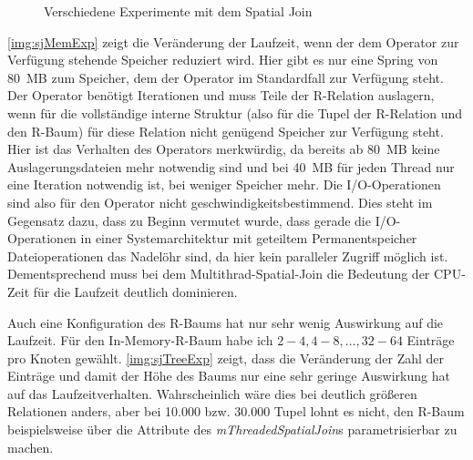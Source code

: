 \documentclass[a4paper,12pt,twoside]{article}
\newcommand{\Fb}[1]{\textit{#1}} %
\begin{document}
{\begin{figure}
	\centering
	\caption{Verschiedene Experimente mit dem Spatial Join}
	\label{img:sjExpAllg}
\end{figure}

\autoref{img:sjMemExp} zeigt die Veränderung der Laufzeit, wenn der dem Operator zur Verfügung stehende Speicher reduziert wird. Hier gibt es nur eine Spring von 80~MB zum Speicher, dem der Operator im Standardfall zur Verfügung steht. Der Operator benötigt Iterationen und muss Teile der R-Relation auslagern, wenn für die vollständige interne Struktur (also für die Tupel der R-Relation und den R-Baum) für diese Relation nicht genügend Speicher zur Verfügung steht. Hier ist das Verhalten des Operators merkwürdig, da bereits ab 80~MB keine Auslagerungsdateien mehr notwendig sind und bei 40~MB für jeden Thread nur eine Iteration notwendig ist, bei weniger Speicher mehr. Die I/O-Operationen sind also für den Operator nicht geschwindigkeitsbestimmend. Dies steht im Gegensatz dazu, dass zu Beginn vermutet wurde, dass gerade die I/O-Operationen in einer Systemarchitektur mit geteiltem Permanentspeicher Dateioperationen das Nadelöhr sind, da hier kein paralleler Zugriff möglich ist. Dementsprechend muss bei dem Multithrad-Spatial-Join die Bedeutung der CPU-Zeit für die Laufzeit deutlich dominieren.

Auch eine Konfiguration des R-Baums hat nur sehr wenig Auswirkung auf die Laufzeit. Für den In-Memory-R-Baum habe ich $2-4, 4-8, \ldots, 32-64$ Einträge pro Knoten gewählt. \autoref{img:sjTreeExp} zeigt, dass die Veränderung der Zahl der Einträge und damit der Höhe des Baums nur eine sehr geringe Auswirkung hat auf das Laufzeitverhalten. Wahrscheinlich wäre dies bei deutlich größeren Relationen anders, aber bei 10.000 bzw. 30.000 Tupel lohnt es nicht, den R-Baum beispielsweise über die Attribute des \Fb{mThreadedSpatialJoin}s parametrisierbar zu machen.   

}
\end{document}
